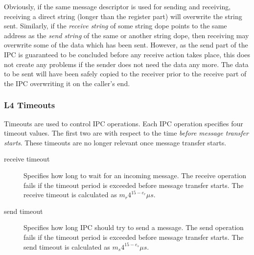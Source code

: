 Obviously, if the same message descriptor is used for sending and
receiving, receiving a direct string (longer than the register part)
will overwrite the string sent. Similarly, if the \emph{receive string}
of some string dope points to the same address as the \emph{send string}
of the same or another string dope, then receiving may overwrite some of
the data which has been sent. However, as the send part of the IPC is
guaranteed to be concluded before any receive action takes place, this
does not create any problems if the sender does not need the data any
more. The data to be sent will have been safely copied to the receiver
prior to the receive part of the IPC overwriting it on the caller's end.

\cbend


\subsubsection{L4 Timeouts}


Timeouts are used to control IPC operations. Each IPC operation
specifies four timeout values. The first two are with respect to the
time \emph{before message transfer starts}. These timeouts are no
longer relevant once message transfer starts. \\ 
 
\begin{center} 
\end{center} 

\begin{description}

\item[receive timeout] Specifies how long to wait for an incoming
  message. The receive operation fails if the timeout period is
  exceeded before message transfer starts. The receive timeout is
  calculated as $m_r4^{15-e_r} \mu s$.

\item[send timeout] Specifies how long IPC should try to send a
  message. The send operation fails if the timeout period is exceeded
  before message transfer starts. The send timeout is calculated as
  $m_s4^{15-e_s} \mu s$.

\end{description}

